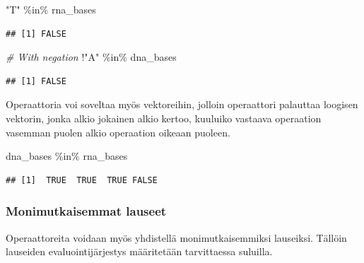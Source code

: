 \documentclass[
]{book}
\newenvironment{Shaded}{\begin{snugshade}}{\end{snugshade}}
\newcommand{\AttributeTok}[1]{\textcolor[rgb]{0.77,0.63,0.00}{#1}}
\newcommand{\CommentTok}[1]{\textcolor[rgb]{0.56,0.35,0.01}{\textit{#1}}}
\newcommand{\DecValTok}[1]{\textcolor[rgb]{0.00,0.00,0.81}{#1}}
\newcommand{\FunctionTok}[1]{\textcolor[rgb]{0.00,0.00,0.00}{#1}}
\newcommand{\NormalTok}[1]{#1}
\newcommand{\OtherTok}[1]{\textcolor[rgb]{0.56,0.35,0.01}{#1}}
\newcommand{\SpecialCharTok}[1]{\textcolor[rgb]{0.00,0.00,0.00}{#1}}
\newcommand{\StringTok}[1]{\textcolor[rgb]{0.31,0.60,0.02}{#1}}
\begin{document}
\begin{Shaded}
\begin{Highlighting}[]
\StringTok{"T"} \SpecialCharTok{\%in\%}\NormalTok{ rna\_bases}
\end{Highlighting}
\end{Shaded}

\begin{verbatim}
## [1] FALSE
\end{verbatim}

\begin{Shaded}
\begin{Highlighting}[]
\CommentTok{\# With negation}
\SpecialCharTok{!}\StringTok{"A"} \SpecialCharTok{\%in\%}\NormalTok{ dna\_bases}
\end{Highlighting}
\end{Shaded}

\begin{verbatim}
## [1] FALSE
\end{verbatim}

Operaattoria voi soveltaa myös vektoreihin, jolloin operaattori palauttaa loogisen vektorin, jonka alkio jokainen alkio kertoo, kuuluiko vastaava operaation vasemman puolen alkio operaation oikeaan puoleen.

\begin{Shaded}
\begin{Highlighting}[]
\NormalTok{dna\_bases }\SpecialCharTok{\%in\%}\NormalTok{ rna\_bases}
\end{Highlighting}
\end{Shaded}

\begin{verbatim}
## [1]  TRUE  TRUE  TRUE FALSE
\end{verbatim}

\hypertarget{monimutkaisemmat-lauseet}{%
\subsubsection{Monimutkaisemmat lauseet}\label{monimutkaisemmat-lauseet}}

Operaattoreita voidaan myös yhdistellä monimutkaisemmiksi lauseiksi. Tällöin lauseiden evaluointijärjestys määritetään tarvittaessa suluilla.

\begin{Shaded}
\end{Shaded}
\end{document}
